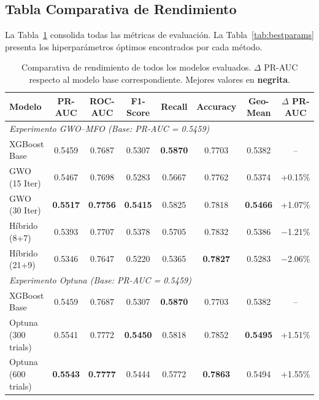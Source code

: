\documentclass[journal]{IEEEtran}
\begin{document}
\subsection{Tabla Comparativa de Rendimiento}
La Tabla~\ref{tab:results} consolida todas las métricas de evaluación. La Tabla~\ref{tab:bestparams} presenta los hiperparámetros óptimos encontrados por cada método.

\begin{table}[!t]
\caption{Comparativa de rendimiento de todos los modelos evaluados. $\Delta$ PR-AUC respecto al modelo base correspondiente. Mejores valores en \textbf{negrita}.}
\label{tab:results}
\centering
\begin{tabular}{lccccccc}
\toprule
Modelo & PR-AUC & ROC-AUC & F1-Score & Recall & Accuracy & Geo-Mean & $\Delta$ PR-AUC \\
\midrule
\multicolumn{8}{l}{\textit{Experimento GWO--MFO (Base: PR-AUC = 0.5459)}} \\
XGBoost Base & 0.5459 & 0.7687 & 0.5307 & \textbf{0.5870} & 0.7703 & 0.5382 & -- \\
GWO (15 Iter) & 0.5467 & 0.7698 & 0.5283 & 0.5667 & 0.7762 & 0.5374 & +0.15\% \\
GWO (30 Iter) & \textbf{0.5517} & \textbf{0.7756} & \textbf{0.5415} & 0.5825 & 0.7818 & \textbf{0.5466} & +1.07\% \\
Híbrido (8+7) & 0.5393 & 0.7707 & 0.5378 & 0.5705 & 0.7832 & 0.5386 & $-$1.21\% \\
Híbrido (21+9) & 0.5346 & 0.7647 & 0.5220 & 0.5365 & \textbf{0.7827} & 0.5283 & $-$2.06\% \\
\midrule
\multicolumn{8}{l}{\textit{Experimento Optuna (Base: PR-AUC = 0.5459)}} \\
XGBoost Base & 0.5459 & 0.7687 & 0.5307 & \textbf{0.5870} & 0.7703 & 0.5382 & -- \\
Optuna (300 trials) & 0.5541 & 0.7772 & \textbf{0.5450} & 0.5818 & 0.7852 & \textbf{0.5495} & +1.51\% \\
Optuna (600 trials) & \textbf{0.5543} & \textbf{0.7777} & 0.5444 & 0.5772 & \textbf{0.7863} & 0.5494 & +1.55\% \\
\bottomrule
\end{tabular}
\end{table}
\end{document}
